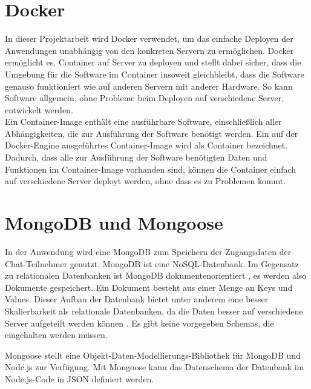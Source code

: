 \section{Docker}\label{sec:Docker}
In dieser Projektarbeit wird Docker verwendet, um das einfache Deployen der Anwendungen unabhängig von den konkreten Servern zu ermöglichen. Docker ermöglicht es, Container auf Server zu deployen und stellt dabei sicher, dass die Umgebung für die Software im Container insoweit gleichbleibt, dass die Software genauso funktioniert wie auf anderen Servern mit anderer Hardware. So kann Software allgemein, ohne Probleme beim Deployen auf verschiedene Server, entwickelt werden.\\ Ein Container-Image enthält eine ausführbare Software, einschließlich aller Abhängigkeiten, die zur Ausführung der Software benötigt werden. Ein auf der Docker-Engine ausgeführtes Container-Image wird als Container bezeichnet. Dadurch, dass alle zur Ausführung der Software benötigten Daten und Funktionen im Container-Image vorhanden sind, können die Container einfach auf verschiedene Server deployt werden, ohne dass es zu Problemen kommt. \cite[vgl.][]{Docker.2019}
\section{MongoDB und Mongoose}\label{sec:MongoDB}
In der Anwendung wird eine MongoDB zum Speichern der Zugangsdaten der Chat-Teilnehmer genutzt. MongoDB ist eine NoSQL-Datenbank. Im Gegensatz zu relationalen Datenbanken ist MongoDB dokumentenorientiert \cite[vgl.][3]{Chadorow.2013}, es werden also Dokumente gespeichert. 
Ein Dokument besteht aus einer Menge an Keys und Values. Dieser Aufbau der Datenbank bietet unter anderem eine
besser Skalierbarkeit als relationale Datenbanken, da die Daten besser auf verschiedene Server aufgeteilt werden
können \cite[vgl.][4]{Chadorow.2013}. Es gibt keine vorgegeben Schemas, die eingehalten werden müssen.

Mongoose stellt eine Objekt-Daten-Modellierungs-Bibliothek für MongoDB und Node.js zur Verfügung. Mit Mongoose kann das Datenschema der Datenbank im Node.js-Code in JSON definiert werden. \cite[vgl.][10]{Holmes.2013}


